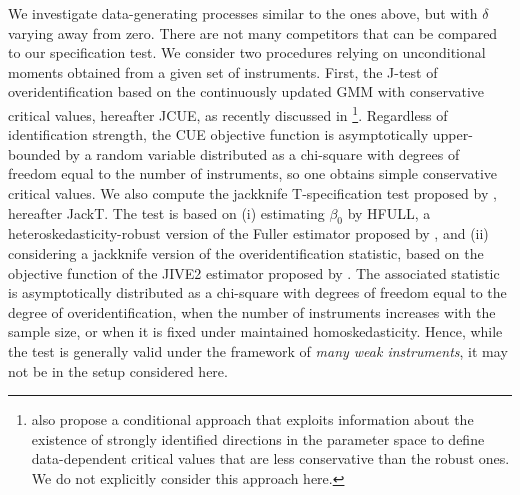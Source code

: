 \documentclass[12pt]{article}
\newcommand{\1}{\mathbf{1}}
\begin{document}
We investigate data-generating processes similar to the ones above,
but with $\delta$ varying away from zero.
There are not many competitors that can be compared to our specification test.
We consider two procedures relying
on unconditional moments obtained from a given set of instruments.
First, the J-test of overidentification based on the
continuously updated GMM with conservative critical values, hereafter
JCUE, as recently discussed in
\cite{AntoineFrazierRenault2026WP}\footnote{\cite{AntoineFrazierRenault2026WP}
also propose a conditional approach that exploits information about
the existence of strongly identified directions in the parameter space
to define data-dependent critical values that are less conservative
than the robust ones. We do not explicitly consider this approach here.}.
Regardless of identification strength, the CUE objective
function is asymptotically upper-bounded by a random variable
distributed as a chi-square with degrees of freedom equal to the
number of instruments, so one obtains simple conservative critical
values. We also compute the jackknife T-specification test proposed
by \cite{Chao2014}, hereafter JackT.
The  test is based on (i) estimating \(\beta_0\) by HFULL, a
heteroskedasticity-robust version of the Fuller estimator proposed by
\cite{hausman_instrumental_2012}, and (ii) considering a jackknife
version of the overidentification statistic, based on the objective
function of the JIVE2 estimator proposed by
\cite{AngristImbensKrueger1999}.  The associated  statistic is
asymptotically distributed as a chi-square with degrees of freedom
equal to the degree of overidentification, when the number of
instruments increases with the sample size, or when it is fixed under
maintained homoskedasticity. Hence, while the test is generally valid under the framework of
{\em many weak instruments}, it may not be in the  setup considered here.
\end{document}
